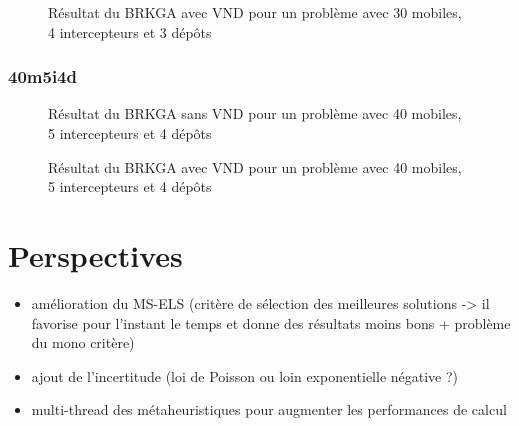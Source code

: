                 \begin{figure}[h!]
                	
                \caption{Résultat du BRKGA avec VND pour un problème avec 30 mobiles, 4 intercepteurs et 3 dépôts}
				\label{fig:30m4i3d-avecvnd}
				\end{figure}
				
            \subsubsection{40m5i4d}
            	\begin{figure}[h!]
                	
                \caption{Résultat du BRKGA sans VND pour un problème avec 40 mobiles, 5 intercepteurs et 4 dépôts}
				\label{fig:40m5i4d-sansvnd}
                \end{figure}
                
                \begin{figure}[h!]
                	
                \caption{Résultat du BRKGA avec VND pour un problème avec 40 mobiles, 5 intercepteurs et 4 dépôts}
				\label{fig:40m5i4d-avecvnd}
				\end{figure}
				

    \section{Perspectives}
    
    	\begin{itemize}
    		\item amélioration du MS-ELS (critère de sélection des meilleures solutions -> il favorise pour l'instant le temps et donne des résultats moins bons + problème du mono critère)
    		\item ajout de l'incertitude (loi de Poisson ou loin exponentielle négative ?)
    		\item multi-thread des métaheuristiques pour augmenter les performances de calcul
    	\end{itemize}
    		
